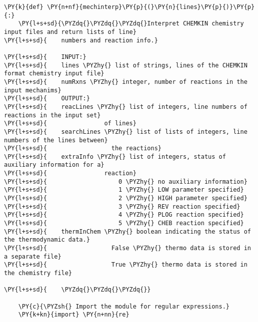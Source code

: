 \begin{Verbatim}[commandchars=\\\{\}]
\PY{k}{def} \PY{n+nf}{mechinterp}\PY{p}{(}\PY{n}{lines}\PY{p}{)}\PY{p}{:}
    \PY{l+s+sd}{\PYZdq{}\PYZdq{}\PYZdq{}Interpret CHEMKIN chemistry input files and return lists of line}
\PY{l+s+sd}{    numbers and reaction info.}

\PY{l+s+sd}{    INPUT:}
\PY{l+s+sd}{    lines \PYZhy{} list of strings, lines of the CHEMKIN format chemistry input file}
\PY{l+s+sd}{    numRxns \PYZhy{} integer, number of reactions in the input mechanims}
\PY{l+s+sd}{    OUTPUT:}
\PY{l+s+sd}{    reacLines \PYZhy{} list of integers, line numbers of reactions in the input set}
\PY{l+s+sd}{                of lines}
\PY{l+s+sd}{    searchLines \PYZhy{} list of lists of integers, line numbers of the lines between}
\PY{l+s+sd}{                  the reactions}
\PY{l+s+sd}{    extraInfo \PYZhy{} list of integers, status of auxiliary information for a}
\PY{l+s+sd}{                reaction}
\PY{l+s+sd}{                    0 \PYZhy{} no auxiliary information}
\PY{l+s+sd}{                    1 \PYZhy{} LOW parameter specified}
\PY{l+s+sd}{                    2 \PYZhy{} HIGH parameter specified}
\PY{l+s+sd}{                    3 \PYZhy{} REV reaction specified}
\PY{l+s+sd}{                    4 \PYZhy{} PLOG reaction specified}
\PY{l+s+sd}{                    5 \PYZhy{} CHEB reaction specified}
\PY{l+s+sd}{    thermInChem \PYZhy{} boolean indicating the status of the thermodynamic data.}
\PY{l+s+sd}{                  False \PYZhy{} thermo data is stored in a separate file}
\PY{l+s+sd}{                  True \PYZhy{} thermo data is stored in the chemistry file}

\PY{l+s+sd}{    \PYZdq{}\PYZdq{}\PYZdq{}}

    \PY{c}{\PYZsh{} Import the module for regular expressions.}
    \PY{k+kn}{import} \PY{n+nn}{re}


\end{Verbatim}
